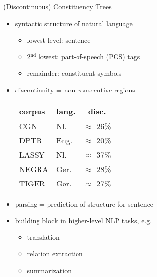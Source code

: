 \documentclass[slides]{subfiles}
\begin{document}
    \begin{frame}[label=working]{(Discontinuous) Constituency Trees}
        \begin{minipage}{.4\linewidth}
            \resizebox{\linewidth}{!}{
                }
        \end{minipage}
        \begin{minipage}{.58\linewidth}
            \begin{itemize}
                \item<+-> syntactic structure of natural language
                \begin{itemize}
                    \item<+-> lowest level: sentence
                    \item<+-> 2\(^\text{nd}\) lowest: part-of-speech (POS) tags
                    \item<+-> remainder: constituent symbols
                \end{itemize}
                \item<+-> discontinuity = non consecutive regions
                {\scriptsize\centering\begin{tabular}{llc}
                    \toprule
                    corpus & lang. & disc.\\%
                    \midrule
                    CGN \citep{hoekstra2001syntactic}  & Nl.       & $\approx$ 26\% \\
                    DPTB  \citep{EvaKal11}             & Eng.      & $\approx$ 20\% \\
                    LASSY \citep{Noord09}              & Nl.       & $\approx$ 37\% \\
                    NEGRA \citep{Skut98}               & Ger.      & $\approx$ 28\% \\
                    TIGER \citep{Brants04}             & Ger.      & $\approx$ 27\% \\
                    \bottomrule
                \end{tabular}}
                \item<+-> parsing = prediction of structure for sentence
                \item<+-> building block in higher-level NLP tasks, e.g.\@
                \begin{itemize}
                    \item translation \citep{Zhang19, Yang22}
                    \item relation extraction \citep{Nguyen19}
                    \item summarization \citep{Balachandran21}
                \end{itemize}
            \end{itemize}
        \end{minipage}
    \end{frame}
\end{document}
